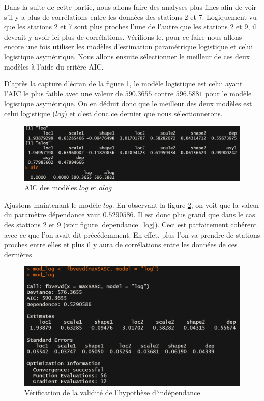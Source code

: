 \documentclass[a4paper,french,10pt]{article}
\begin{document}
Dans la suite de cette partie, nous allons faire des analyses plus fines afin de voir s'il y a plus de corrélations entre les données des stations 2 et 7. Logiquement vu que les stations 2 et 7 sont plus proches l'une de l'autre que les stations 2 et 9, il devrait y avoir ici plus de corrélations. Vérifions le. pour ce faire nous allons encore une fois utiliser les modèles d'estimation paramétrique logistique et celui logistique asymétrique. Nous allons ensuite sélectionner le meilleur de ces deux modèles à l'aide du critère AIC.

D'après la capture d'écran de la figure \ref{AIC_2_7}, le modèle logistique est celui ayant l'AIC le plus faible avec une valeur de $590.3655$ contre $596.5881$ pour le modèle logistique asymétrique. On en déduit donc que le meilleur des deux modèles est celui logistique ($log$) et c'est donc ce dernier que nous sélectionnerons.

\begin{figure}[htp] 
	\centering
	\includegraphics[scale=0.45]{images/AIC_stations2_7.png}
	\caption{AIC des modèles $log$ et $alog$}
	\label{AIC_2_7}
\end{figure}

Ajustons maintenant le modèle $log$. En observant la figure \ref{dependance_log2}, on voit que la valeur du paramètre dépendance vaut $0.5290586$. Il est donc plus grand que dans le cas des stations 2 et 9 (voir figure \ref{dependance_log}). Ceci est parfaitement cohérent avec ce que l'on avait dit précédemment. En effet, plus l'on va prendre de stations proches entre elles et plus il y aura de corrélations entre les données de ces dernières.

\begin{figure}[htp] 
	\centering
	\includegraphics[scale=0.45]{images/dependance_log2.png}
	\caption{Vérification de la validité de l'hypothèse d'indépendance}
	\label{dependance_log2}
\end{figure}
\end{document}

